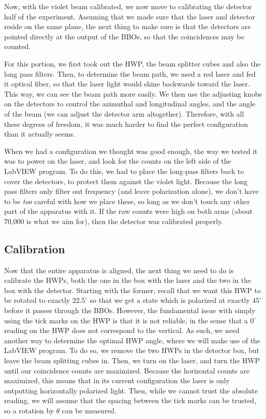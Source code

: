 \documentclass[10pt]{article}
\begin{document}
	Now, with the violet beam calibrated, we now move to calibrating the detector half of the experiment.
	Assuming that we made sure that the laser and detector reside on the same plane, the next thing to make
	sure is that the detectors are pointed directly at the output of the BBOs, so that the coincidences may
	be counted. 

	For this portion, we first took out the HWP, the beam splitter cubes and also the long pass
	filters. Then, to determine the beam path, we used a red laser and fed it optical fiber, so that the
	laser light would shine backwards toward the laser. This way, we can see the beam path more easily. We
	then use the adjusting knobs on the detectors to control the azimuthal and longitudinal angles, and the
	angle of the beam (we can adjust the detector arm altogether). Therefore, with all these degrees of
	freedom, it was much harder to find the perfect configuration than it actually seems. 

	When we had a configuration we thought was good enough, the way we tested it was to power on the laser,
	and look for the counts on the left side of the LabVIEW program. To do this, we had to place the
	long-pass filters back to cover the detectors, to protect them against the violet light. Because the long
	pass filters only filter out frequency (and leave polarization alone), we don't have to be \textit{too}
	careful with how we place these, so long as we don't touch any other part of the apparatus with it.
	If the raw counts were high on both arms (about 70,000 is what we aim for), then the detector was 
	calibrated properly.

	\subsection{Calibration}

	Now that the entire apparatus is aligned, the next thing we need to do is calibrate the HWPs, both the
	one in the box with the laser and the two in the box with the detector. Starting with the former, recall
	that we want this HWP to be rotated to exactly \( 22.5^{\circ} \) so that we get a state which is
	polarized at exactly \( 45^{\circ} \) before it passes through the BBOs. However, the fundamental issue
	with simply using the tick marks on the HWP is that it is not reliable, in the sense that a \( 0^{\circ}
	\) reading on the HWP does not correspond to the vertical. As such, we need another way to determine the
	optimal HWP angle, where we will make use of the LabVIEW program.   
	To do so, we remove the two HWPs in the detector box,
	but leave the beam splitting cubes in. Then, we turn on the laser, and turn the HWP until our coincidence
	counts are maximized. Because the horizontal counts are maximized, 
	this means that in its current configuration the
	laser is only outputting horizontally polarized light. Then, while we cannot trust the absolute reading,
	we will assume that the spacing between the tick marks can be trusted, so a rotation by \( \theta \) can
	be measured.   
\end{document}
